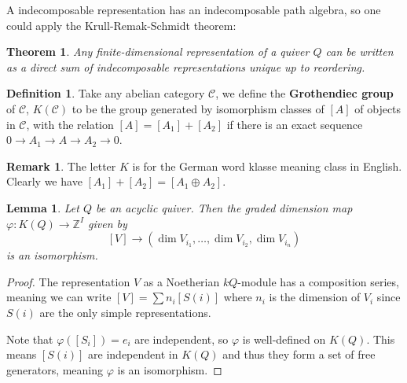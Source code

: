 \documentclass[12pt]{report}
\newtheorem{theorem}{Theorem}[section]
\newtheorem{lemma}{Lemma}[section]
\theoremstyle{remark}
\theoremstyle{definition}
\newtheorem{remark}{Remark}[section]
\newtheorem{definition}{Definition}[section]
\newcommand{\Z}[0]{\mathbb{Z}}
\begin{document}
    A indecomposable representation has an indecomposable path algebra, so one could apply the Krull-Remak-Schmidt theorem:
    \begin{theorem}
        Any finite-dimensional representation of a quiver $Q$ can be written as a direct sum of indecomposable representations unique up to reordering.
    \end{theorem}
    \begin{definition}
        Take any abelian category $\mathcal C$, we define the \textbf{Grothendiec group} of $\mathcal C$, $K(\mathcal C)$ to be the group generated by isomorphism classes of $[A]$ of objects in $\mathcal C$, with the relation $[A]=[A_1]+[A_2]$ if there is an exact sequence $0\to A_1\to A\to A_2\to 0$.
    \end{definition}
    \begin{remark}
        The letter $K$ is for the German word klasse meaning class in English. Clearly we have $[A_1]+[A_2]=[A_1\oplus A_2]$.
    \end{remark}
    \begin{lemma}
        Let $Q$ be an acyclic quiver. Then the \textup{graded dimension} map $\varphi:K(Q)\to\Z^I$ given by
        \[[V]\to (\dim V_{i_1},\dots, \dim V_{i_2},\dim V_{i_n})\]
        is an isomorphism.
    \end{lemma}
    \begin{proof}
        The representation $V$ as a Noetherian $kQ$-module has a composition series, meaning we can write $[V]=\sum n_i[S(i)]$ where $n_i$ is the dimension of $V_i$ since $S(i)$ are the only simple representations.

        Note that $\varphi([S_i])=e_i$ are independent, so $\varphi$ is well-defined on $K(Q)$. This means $[S(i)]$ are independent in $K(Q)$ and thus they form a set of free generators, meaning $\varphi$ is an isomorphism.
    \end{proof}
\end{document}
